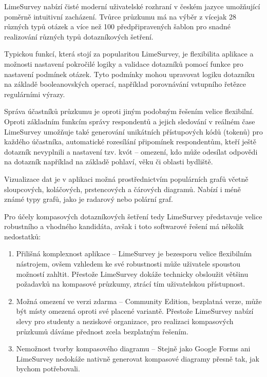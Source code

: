 LimeSurvey nabízí čisté moderní uživatelské rozhraní v českém jazyce umožňující poměrně intuitivní zacházení. 
Tvůrce průzkumu má na výběr z vícejak 28 různých typů otázek a více než 100 předpřipravených šablon pro snadné 
realizování různých typů dotazníkových šetření.

Typickou funkcí, která stojí za popularitou LimeSurvey, je flexibilita aplikace a možnosti nastavení pokročilé 
logiky a validace dotazníků pomocí funkce pro nastavení podmínek otázek. Tyto podmínky mohou upravovat logiku 
dotazníku na základě booleanovských operací, například porovnávání vstupního řetězce regulárními výrazy.

Správa účastníků průzkumu je oproti jiným podobným řešením velice flexibilní. Oproti základním funkcím správy 
respondentů a jejich sledování v reálném čase LimeSurvey umožňuje také generování unikátních přístupových kódů 
(tokenů) pro každého účastníka, automatické rozesílání připomínek respondentům, kteří ještě dotazník nevyplnili a 
nastavení tzv. kvót – omezení, kdo může odesílat odpovědi na dotazník například na základě pohlaví, věku či oblasti 
bydliště.

Vizualizace dat je v aplikaci možná prostřednictvím populárních grafů včetně sloupcových, koláčových,
prstencových a čárových diagramů. Nabízí i méně známé typy grafů, jako je radarový nebo polární graf.~\cite{LimeSurvey:online}

Pro účely kompasových dotazníkových šetření tedy LimeSurvey představuje velice robustního a vhodného 
kandidáta, avšak i toto softwarové řešení má několik nedostatků:

\begin{enumerate}
    \item Přilišná komplexnost aplikace – LimeSurvey je bezesporu velice flexibilním nástrojem, 
    ovšem vzhledem ke své robustnosti může uživatele spoustou možností zahltit. Přestože LimeSurvey dokáže 
    technicky obsloužit většinu požadavků na kompasové průzkumy, ztrácí tím uživatelskou přístupnost.
    \item Možná omezení ve verzi zdarma – Community Edition, bezplatná verze, může být místy omezená 
    oproti své placené variantě. Přestože LimeSurvey nabízí slevy pro studenty a neziskové organizace, 
    pro realizaci kompasových průzkumů dáváme přednost zcela bezplatným řešením.
    \item Nemožnost tvorby kompasového diagramu – Stejně jako Google Forms ani LimeSurvey nedokáže nativně 
    generovat kompasové diagramy přesně tak, jak bychom potřebovali.
\end{enumerate}

